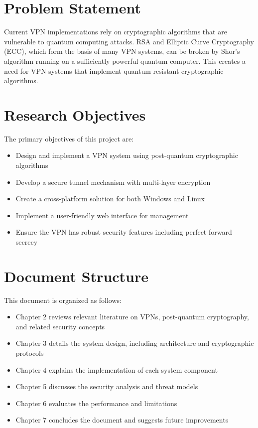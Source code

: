 \documentclass[12pt,a4paper]{report}
\begin{document}
\section{Problem Statement}
Current VPN implementations rely on cryptographic algorithms that are vulnerable to quantum computing attacks. RSA and Elliptic Curve Cryptography (ECC), which form the basis of many VPN systems, can be broken by Shor's algorithm running on a sufficiently powerful quantum computer. This creates a need for VPN systems that implement quantum-resistant cryptographic algorithms.

\section{Research Objectives}
The primary objectives of this project are:
\begin{itemize}
    \item Design and implement a VPN system using post-quantum cryptographic algorithms
    \item Develop a secure tunnel mechanism with multi-layer encryption
    \item Create a cross-platform solution for both Windows and Linux
    \item Implement a user-friendly web interface for management
    \item Ensure the VPN has robust security features including perfect forward secrecy
\end{itemize}

\section{Document Structure}
This document is organized as follows:
\begin{itemize}
    \item Chapter 2 reviews relevant literature on VPNs, post-quantum cryptography, and related security concepts
    \item Chapter 3 details the system design, including architecture and cryptographic protocols
    \item Chapter 4 explains the implementation of each system component
    \item Chapter 5 discusses the security analysis and threat models
    \item Chapter 6 evaluates the performance and limitations
    \item Chapter 7 concludes the document and suggests future improvements
\end{itemize}
\end{document}
